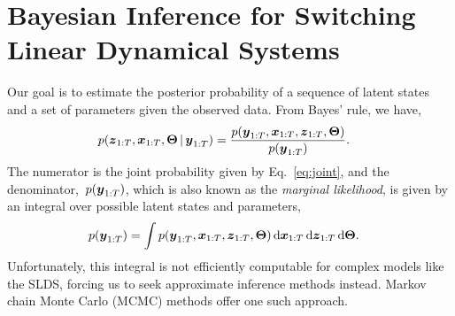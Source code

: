 \documentclass{article}
\begin{document}



\appendix

\section{Bayesian Inference for Switching Linear Dynamical Systems}
\label{app:mcmc}
Our goal is to estimate the posterior probability of a sequence 
of latent states and a set of parameters given the observed data.
From Bayes' rule, we have,
\begin{align}
  p(\boldsymbol{z}_{1:T}, \boldsymbol{x}_{1:T}, \boldsymbol{\Theta} \,|\, \boldsymbol{y}_{1:T}) 
  &= 
  \frac{p(\boldsymbol{y}_{1:T}, \boldsymbol{x}_{1:T}, \boldsymbol{z}_{1:T}, \boldsymbol{\Theta})}{p(\boldsymbol{y}_{1:T})}.
\end{align}
The numerator is the joint probability given by Eq.~\eqref{eq:joint}, and
the denominator,~$p(\boldsymbol{y}_{1:T})$, which is also known as the
\emph{marginal likelihood}, is given by an integral over possible
latent states and parameters,
\begin{align}
  p(\boldsymbol{y}_{1:T}) &= \int p(\boldsymbol{y}_{1:T}, \boldsymbol{x}_{1:T}, \boldsymbol{z}_{1:T}, \boldsymbol{\Theta}) 
  \, \mathrm{d}\boldsymbol{x}_{1:T} \, \mathrm{d}\boldsymbol{z}_{1:T} \, \mathrm{d}\boldsymbol{\Theta}.
\end{align}
Unfortunately, this integral is not efficiently computable for complex
models like the SLDS, forcing us to seek approximate inference methods
instead. Markov chain Monte Carlo (MCMC) methods \citep{gilks2005markov, robert2013monte} offer one
such approach. 
\end{document}
